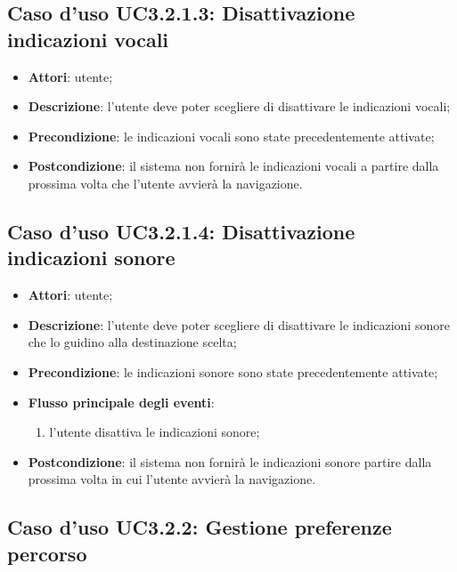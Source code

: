 \documentclass[../AnalisiDeiRequisiti.tex]{subfiles}
\begin{document}
\subsection{Caso d'uso UC3.2.1.3: Disattivazione indicazioni vocali}
\begin{itemize}
\item \textbf{Attori}: utente;
\item \textbf{Descrizione}: l'utente deve poter scegliere di disattivare le indicazioni vocali; 
      \item \textbf{Precondizione}: le indicazioni vocali sono state precedentemente attivate;
    \item \textbf{Postcondizione}: il sistema non fornirà le indicazioni vocali a partire dalla prossima volta che l'utente avvierà la navigazione.
  \end{itemize}
\hypertarget{UC3.2.1.4}{}
\subsection{Caso d'uso UC3.2.1.4: Disattivazione indicazioni sonore}
\begin{itemize}
\item \textbf{Attori}: utente;
\item \textbf{Descrizione}: l'utente deve poter scegliere di disattivare le indicazioni sonore che lo guidino alla destinazione scelta; 
      \item \textbf{Precondizione}: le indicazioni sonore sono state precedentemente attivate;

        \item \textbf{Flusso principale degli eventi}:
          \begin{enumerate}
          \item l'utente disattiva le indicazioni sonore;

      \end{enumerate}
    \item \textbf{Postcondizione}: il sistema non fornirà le indicazioni sonore partire dalla prossima volta in cui l'utente avvierà la navigazione.
  \end{itemize}
\hypertarget{UC3.2.2}{}
\subsection{Caso d'uso UC3.2.2: Gestione preferenze percorso}
\end{document}
